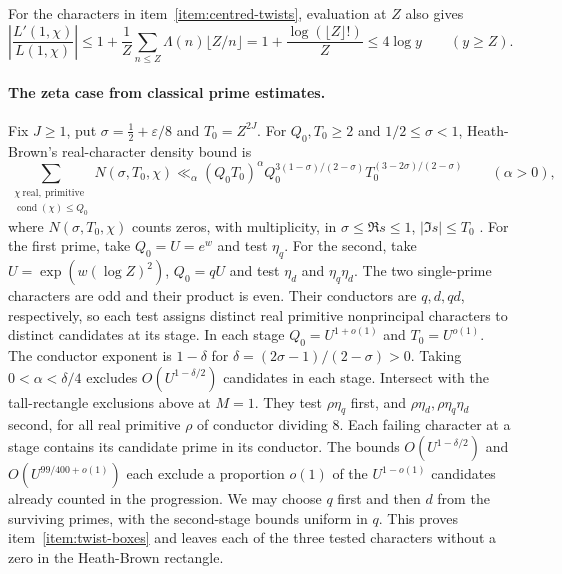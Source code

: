 For the characters in item~\ref{item:centred-twists}, evaluation at \(Z\) also gives
\[
 \left|\frac{L'(1,\chi)}{L(1,\chi)}\right|
 \le 1+ \frac{1}{Z}\sum_{n\le Z}\Lambda(n)\lfloor Z/n\rfloor
 =1+\frac{\log(\lfloor Z\rfloor!)}{Z}
 \le4\log y\qquad (y\ge Z).
\]

\paragraph{The zeta case from classical prime estimates.}
Fix \(J\ge1\), put \(\sigma=\tfrac12+\varepsilon/8\) and
\(T_0=Z^{2J}\).
%
For \(Q_0,T_0\ge2\) and \(1/2\le\sigma<1\),
Heath-Brown's real-character density bound is
\[
 \sum_{\substack{\chi\ \mathrm{real,\ primitive}\\
                  \operatorname{cond}(\chi)\le Q_0}}
 N(\sigma,T_0,\chi)
 \ll_\alpha (Q_0T_0)^\alpha
      Q_0^{3(1-\sigma)/(2-\sigma)}T_0^{(3-2\sigma)/(2-\sigma)}
 \qquad(\alpha>0),
\]
where \(N(\sigma,T_0,\chi)\) counts zeros, with multiplicity, in
\(\sigma\le\Re s\le1\), \(|\Im s|\le T_0\)
\cite[Corollary~1 and Theorem~3]{f1heath-brown}.
For the first prime, take \(Q_0=U=e^w\) and test \(\eta_q\).
For the second, take \(U=\exp(w(\log Z)^2)\), \(Q_0=qU\) and test
\(\eta_d\) and \(\eta_q\eta_d\). The two single-prime characters are
odd and their product is even. Their conductors are \(q,d,qd\),
respectively, so each test assigns distinct real primitive
nonprincipal characters to distinct candidates at its stage.
In each stage \(Q_0=U^{1+o(1)}\) and \(T_0=U^{o(1)}\).
The conductor exponent is \(1-\delta\) for
\(\delta=(2\sigma-1)/(2-\sigma)>0\). Taking \(0<\alpha<\delta/4\)
excludes \(O(U^{1-\delta/2})\) candidates in each stage.
Intersect with the tall-rectangle exclusions above at \(M=1\).
They test \(\rho\eta_q\) first, and \(\rho\eta_d,\rho\eta_q\eta_d\)
second, for all real primitive \(\rho\) of conductor dividing \(8\).
Each failing character at a stage contains its candidate prime
in its conductor. The bounds \(O(U^{1-\delta/2})\) and
\(O(U^{99/400+o(1)})\) each exclude a proportion \(o(1)\) of the
\(U^{1-o(1)}\) candidates already counted in the progression.
We may choose \(q\) first and then \(d\) from the surviving primes,
with the second-stage bounds uniform in \(q\). This proves
item~\ref{item:twist-boxes} and leaves each of the three tested
characters without a zero in the Heath-Brown rectangle.

